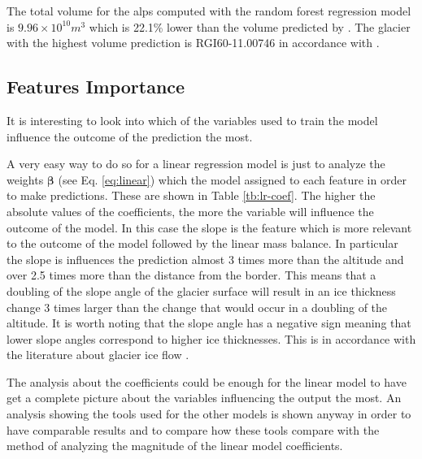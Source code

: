 The total volume for the alps computed with the random forest regression model is $9.96 \times 10^{10}m^3$ which is 22.1\% lower than the volume predicted by \citet{Farinotti2019}. The glacier with the highest volume prediction is RGI60-11.00746 in accordance with \citet{Farinotti2019}.

\subsection{Features Importance}  

It is interesting to look into which of the variables used to train the model influence the outcome of the prediction the most.

A very easy way to do so for a linear regression model is just to analyze the weights $\bm{\beta}$ (see Eq. \ref{eq:linear}) which the model assigned to each feature in order to make predictions. These are shown in Table \ref{tb:lr-coef}.
The higher the absolute values of the coefficients, the more the variable will influence the outcome of the model. In this case the slope is the feature which is more relevant to the outcome of the model followed by the linear mass balance. In particular the slope is influences the prediction almost 3 times more than the altitude and over 2.5 times more than the distance from the border. This means that a doubling of the slope angle of the glacier surface will result in an ice thickness change 3 times larger than the change that would occur in a doubling of the altitude. It is worth noting that the slope angle has a negative sign meaning that lower slope angles correspond to higher ice thicknesses. This is in accordance with the literature about glacier ice flow \cite[P. 286]{cuffey2010physics}.

The analysis about the coefficients could be enough for the linear model to have get a complete picture about the variables influencing the output the most. An analysis showing the tools used for the other models is shown anyway in order to have comparable results and to compare how these tools compare with the method of analyzing the magnitude of the linear model coefficients. 

